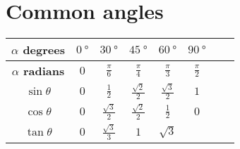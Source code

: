 \section*{Common angles}

\begin{table}[!ht]
\setlength{\tabcolsep}{1em} %
\centering
  \begin{tabular}{|c|c|c|c|c|c|c|c|}
    \hline
    \textbf{$\alpha$ degrees}
      & $\SI{0}{\degree}$
      & $\SI{30}{\degree}$
      & $\SI{45}{\degree}$
      & $\SI{60}{\degree}$
      & $\SI{90}{\degree}$\\
    \hline
    \textbf{$\alpha$ radians}
      & $0$
      & $\frac{\pi}{6}$
      & $\frac{\pi}{4}$
      & $\frac{\pi}{3}$
      & $\frac{\pi}{2}$\\
    \hline
    \textbf{$\sin \theta$}
      & $0$
      & $\frac{1}{2}$
      & $\frac{\sqrt 2}{2}$
      & $\frac{\sqrt 3}{2}$
      & $1$\\
    \hline
    \textbf{$\cos \theta$}
      & $0$
      & $\frac{\sqrt 3}{2}$
      & $\frac{\sqrt 2}{2}$
      & $\frac{1}{2}$
      & $0$\\
    \hline
    \textbf{$\tan \theta$}
      & $0$
      & $\frac{\sqrt 3}{3}$
      & $1$
      & $\sqrt 3$
      &\\
    \hline
  \end{tabular}
\end{table}